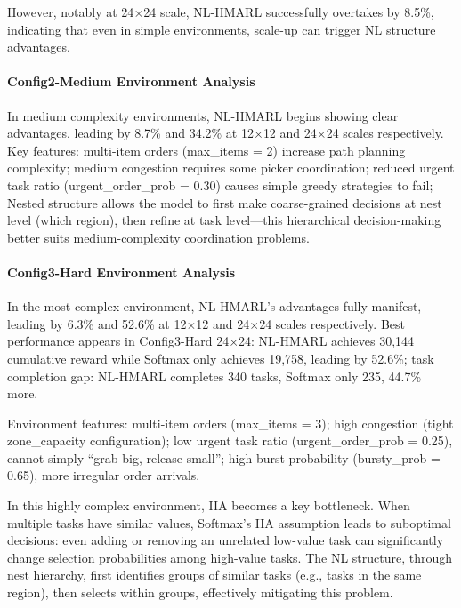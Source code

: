 \documentclass[12pt,a4paper]{article}
\begin{document}
However, notably at 24$\times$24 scale, NL-HMARL successfully overtakes by 8.5\%, indicating that even in simple environments, scale-up can trigger NL structure advantages.

\paragraph{Config2-Medium Environment Analysis}

In medium complexity environments, NL-HMARL begins showing clear advantages, leading by 8.7\% and 34.2\% at 12$\times$12 and 24$\times$24 scales respectively. Key features: multi-item orders (max\_items = 2) increase path planning complexity; medium congestion requires some picker coordination; reduced urgent task ratio (urgent\_order\_prob = 0.30) causes simple greedy strategies to fail; Nested structure allows the model to first make coarse-grained decisions at nest level (which region), then refine at task level---this hierarchical decision-making better suits medium-complexity coordination problems.

\paragraph{Config3-Hard Environment Analysis}

In the most complex environment, NL-HMARL's advantages fully manifest, leading by 6.3\% and 52.6\% at 12$\times$12 and 24$\times$24 scales respectively. Best performance appears in Config3-Hard 24$\times$24: NL-HMARL achieves 30,144 cumulative reward while Softmax only achieves 19,758, leading by 52.6\%; task completion gap: NL-HMARL completes 340 tasks, Softmax only 235, 44.7\% more.

Environment features: multi-item orders (max\_items = 3); high congestion (tight zone\_capacity configuration); low urgent task ratio (urgent\_order\_prob = 0.25), cannot simply ``grab big, release small''; high burst probability (bursty\_prob = 0.65), more irregular order arrivals.

In this highly complex environment, IIA becomes a key bottleneck. When multiple tasks have similar values, Softmax's IIA assumption leads to suboptimal decisions: even adding or removing an unrelated low-value task can significantly change selection probabilities among high-value tasks. The NL structure, through nest hierarchy, first identifies groups of similar tasks (e.g., tasks in the same region), then selects within groups, effectively mitigating this problem.
\end{document}

